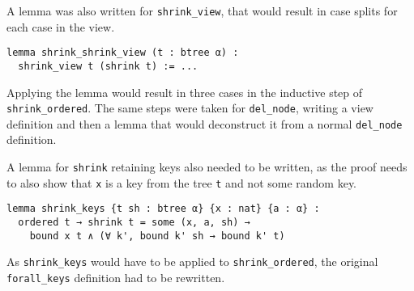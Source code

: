 A lemma was also written for \lstinline{shrink_view}, that would result in case splits for each case in the view. 

\begin{lstlisting}
lemma shrink_shrink_view (t : btree α) : 
  shrink_view t (shrink t) := ...
\end{lstlisting}

Applying the lemma would result in three cases in the inductive step of \lstinline{shrink_ordered}. The same steps were taken for \lstinline{del_node}, writing a view definition and then a lemma that would deconstruct it from a normal \lstinline{del_node} definition.

A lemma for \lstinline{shrink} retaining keys also needed to be written, as the proof needs to also show that \lstinline{x} is a key from the tree \lstinline{t} and not some random key.

\begin{lstlisting}
lemma shrink_keys {t sh : btree α} {x : nat} {a : α} :
  ordered t → shrink t = some (x, a, sh) → 
    bound x t ∧ (∀ k', bound k' sh → bound k' t)
\end{lstlisting}

As \lstinline{shrink_keys} would have to be applied to \lstinline{shrink_ordered}, the original \lstinline{forall_keys} definition had to be rewritten. 

